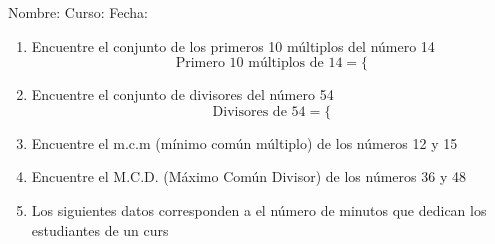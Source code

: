 \documentclass[fleqn]{article}
\newcommand{\LineaNombre}{%
\par
\vspace{\baselineskip}
Nombre:\hrulefill \; Curso: \underline{\hspace*{48pt}} \; Fecha: \underline{\hspace*{2.5cm}} \relax
\par}
\begin{document}
\LineaNombre
\begin{enumerate}
 \item Encuentre el conjunto de los primeros 10 múltiplos del número 14
 \noanswer
 \[\text{Primero 10 múltiplos de }14=\{\]
 \item Encuentre el conjunto de divisores del número 54
 \noanswer
 \[\text{Divisores de }54=\{\]
 \item Encuentre el m.c.m (mínimo común múltiplo) de los números 12 y 15
 \noanswer
 \item Encuentre el M.C.D. (Máximo Común Divisor) de los números 36 y 48
 \noanswer
 \item Los siguientes datos corresponden a el número de minutos que dedican los estudiantes de un curs
 \end{enumerate}
\end{document}
